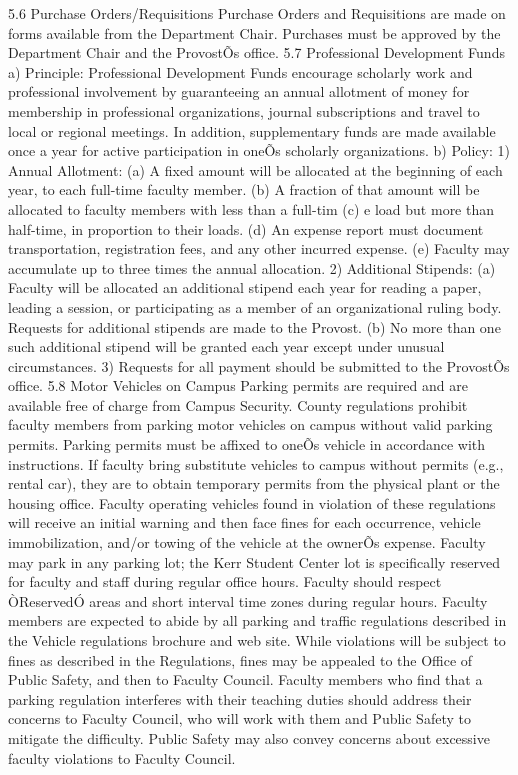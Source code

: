 \documentclass[letterpaper, 11pt]{article}
\begin{document}
	5.6 Purchase Orders/Requisitions
	Purchase Orders and Requisitions are made on forms available from the Department Chair.  Purchases must be approved by the Department Chair and the ProvostÕs office.
	5.7 Professional Development Funds
	a) Principle:  Professional Development Funds encourage scholarly work and professional involvement by guaranteeing an annual allotment of money for membership in professional organizations, journal subscriptions and travel to local or regional meetings.  In addition, supplementary funds are made available once a year for active participation in oneÕs scholarly organizations.
	b) Policy:
	1) Annual Allotment:
	(a) A fixed amount will be allocated at the beginning of each year, to each full-time faculty member.
	(b) A fraction of that amount will be allocated to faculty members with less than a full-tim
	(c) e load but more than half-time, in proportion to their loads.
	(d) An expense report must document transportation, registration fees, and any other incurred expense.
	(e) Faculty may accumulate up to three times the annual allocation.
	2) Additional Stipends:
	(a) Faculty will be allocated an additional stipend each year for reading a paper, leading a session, or participating as a member of an organizational ruling body.  Requests for additional stipends are made to the Provost.
	(b) No more than one such additional stipend will be granted each year except under unusual circumstances.
	3) Requests for all payment should be submitted to the ProvostÕs office.
	5.8 Motor Vehicles on Campus
	Parking permits are required and are available free of charge from Campus Security.  County regulations prohibit faculty members from parking motor vehicles on campus without valid parking permits.  Parking permits must be affixed to oneÕs vehicle in accordance with instructions.  If faculty bring substitute vehicles to campus without permits (e.g., rental car), they are to obtain temporary permits from the physical plant or the housing office.  Faculty operating vehicles found in violation of these regulations will receive an initial warning and then face fines for each occurrence, vehicle immobilization, and/or towing of the vehicle at the ownerÕs expense.  Faculty may park in any parking lot; the Kerr Student Center lot is specifically reserved for faculty and staff during regular office hours.  Faculty should respect ÒReservedÓ areas and short interval time zones during regular hours.
	Faculty members are expected to abide by all parking and traffic regulations described in the Vehicle regulations brochure and web site.  While violations will be subject to fines as described in the Regulations, fines may be appealed to the Office of Public Safety, and then to Faculty Council.  Faculty members who find that a parking regulation interferes with their teaching duties should address their concerns to Faculty Council, who will work with them and Public Safety to mitigate the difficulty.  Public Safety may also convey concerns about excessive faculty violations to Faculty Council.
\end{document}

